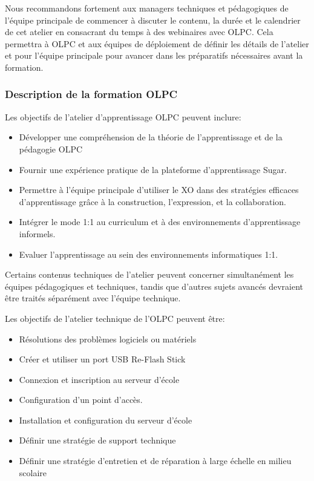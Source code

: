 \documentclass[11pt]{article}
\begin{document}
Nous recommandons fortement aux managers techniques et pédagogiques de
l'équipe principale de commencer à discuter le contenu, la durée et le
calendrier de cet atelier en consacrant du temps à des webinaires avec
OLPC. Cela permettra à OLPC et aux équipes de déploiement de définir les
détails de l'atelier et pour l'équipe principale pour avancer dans les
préparatifs nécessaires avant la formation.
\subsubsection{Description de la formation OLPC}
\label{sec-9-2-1}



Les objectifs de l'atelier d'apprentissage OLPC peuvent inclure:

\begin{itemize}
\item Développer une compréhension de la théorie de l'apprentissage et de la
  pédagogie OLPC
\item Fournir une expérience pratique de la plateforme d'apprentissage Sugar.
\item Permettre à l'équipe principale d'utiliser le XO dans des stratégies
  efficaces d'apprentissage grâce à la construction, l'expression, et la
  collaboration.
\item Intégrer le mode 1:1 au curriculum et à des environnements
  d'apprentissage informels.
\item Evaluer l'apprentissage au sein des environnements informatiques 1:1.
\end{itemize}

Certains contenus techniques de l'atelier peuvent concerner simultanément
les équipes pédagogiques et techniques, tandis que d'autres sujets avancés
devraient être traités séparément avec l'équipe technique.

Les objectifs de l'atelier technique de l'OLPC peuvent être:

\begin{itemize}
\item Résolutions des problèmes logiciels ou matériels
\item Créer et utiliser un port USB Re-Flash Stick
\item Connexion et inscription au serveur d'école
\item Configuration d'un point d'accès.
\item Installation et configuration du serveur d'école
\item Définir une stratégie de support technique
\item Définir une stratégie d'entretien et de réparation à large échelle en
  milieu scolaire
\end{itemize}
\end{document}
